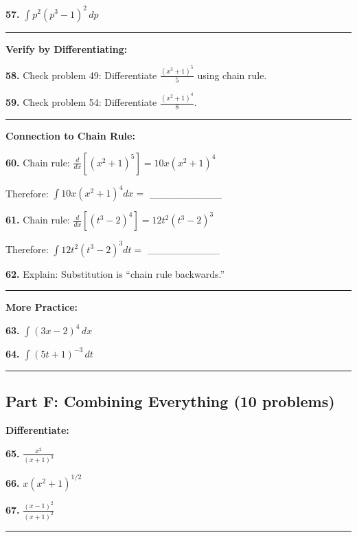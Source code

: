 \documentclass[
  11pt,
]{article}
\begin{document}
\textbf{57.} \(\int p^2(p^3 - 1)^2 \, dp\)

\begin{center}\rule{0.5\linewidth}{0.5pt}\end{center}

\textbf{Verify by Differentiating:}

\textbf{58.} Check problem 49: Differentiate \(\frac{(x^3+1)^5}{5}\)
using chain rule.

\textbf{59.} Check problem 54: Differentiate \(\frac{(x^2+1)^4}{8}\).

\begin{center}\rule{0.5\linewidth}{0.5pt}\end{center}

\textbf{Connection to Chain Rule:}

\textbf{60.} Chain rule: \(\frac{d}{dx}[(x^2+1)^5] = 10x(x^2+1)^4\)

Therefore: \(\int 10x(x^2+1)^4 dx ={}\) \_\_\_\_\_\_\_\_\_\_

\textbf{61.} Chain rule: \(\frac{d}{dx}[(t^3-2)^4] = 12t^2(t^3-2)^3\)

Therefore: \(\int 12t^2(t^3-2)^3 dt ={}\) \_\_\_\_\_\_\_\_\_\_

\textbf{62.} Explain: Substitution is ``chain rule backwards.''

\begin{center}\rule{0.5\linewidth}{0.5pt}\end{center}

\textbf{More Practice:}

\textbf{63.} \(\int (3x - 2)^4 \, dx\)

\textbf{64.} \(\int (5t + 1)^{-3} \, dt\)

\begin{center}\rule{0.5\linewidth}{0.5pt}\end{center}

\hypertarget{part-f-combining-everything-10-problems}{%
\subsection{Part F: Combining Everything (10
problems)}\label{part-f-combining-everything-10-problems}}

\textbf{Differentiate:}

\textbf{65.} \(\frac{x^2}{(x+1)^3}\)

\textbf{66.} \(x(x^2 + 1)^{1/2}\)

\textbf{67.} \(\frac{(x-1)^2}{(x+1)^2}\)

\begin{center}\rule{0.5\linewidth}{0.5pt}\end{center}
\end{document}
